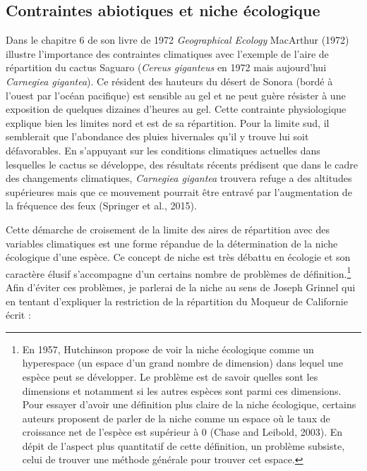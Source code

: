 \subsection*{Contraintes abiotiques et niche
écologique}\label{contraintes-abiotiques-et-niche-uxe9cologique}

Dans le chapitre 6 de son livre de 1972 \emph{Geographical Ecology}
MacArthur (1972) illustre l'importance des contraintes climatiques avec
l'exemple de l'aire de répartition du cactus Saguaro (\emph{Cereus
giganteus} en 1972 mais aujourd'hui \emph{Carnegiea gigantea}). Ce
résident des hauteurs du désert de Sonora (bordé à l'ouest par l'océan
pacifique) est sensible au gel et ne peut guère résister à une
exposition de quelques dizaines d'heures au gel. Cette contrainte
physiologique explique bien les limites nord et est de sa répartition.
Pour la limite sud, il semblerait que l'abondance des pluies hivernales
qu'il y trouve lui soit défavorables. En s'appuyant sur les conditions
climatiques actuelles dans lesquelles le cactus se développe, des
résultats récents prédisent que dans le cadre des changements
climatiques, \emph{Carnegiea gigantea} trouvera refuge a des altitudes
supérieures mais que ce mouvement pourrait être entravé par
l'augmentation de la fréquence des feux (Springer et al., 2015).

Cette démarche de croisement de la limite des aires de répartition avec
des variables climatiques est une forme répandue de la détermination de
la niche écologique d'une espèce. Ce concept de niche est très débattu
en écologie et son caractère élusif s'accompagne d'un certains nombre de
problèmes de définition.\footnote{En 1957, Hutchinson propose de voir la
  niche écologique comme un hyperespace (un espace d'un grand nombre de
  dimension) dans lequel une espèce peut se développer. Le problème est
  de savoir quelles sont les dimensions et notamment si les autres
  espèces sont parmi ces dimensions. Pour essayer d'avoir une définition
  plus claire de la niche écologique, certains auteurs proposent de
  parler de la niche comme un espace où le taux de croissance net de
  l'espèce est supérieur à 0 (Chase and Leibold, 2003). En dépit de
  l'aspect plus quantitatif de cette définition, un problème subsiste,
  celui de trouver une méthode générale pour trouver cet espace.} Afin
d'éviter ces problèmes, je parlerai de la niche au sens de Joseph
Grinnel qui en tentant d'expliquer la restriction de la répartition du
Moqueur de Californie écrit :

